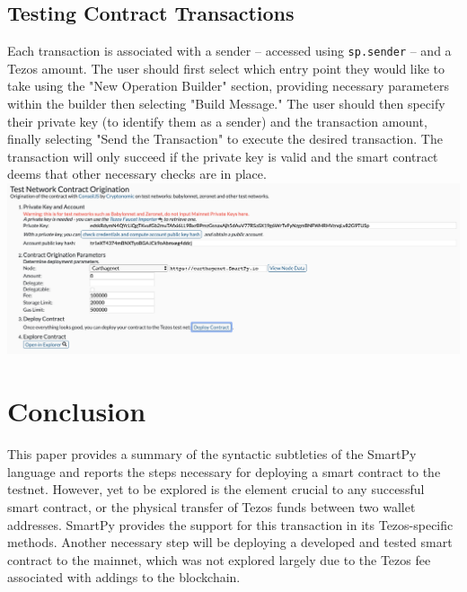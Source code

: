 \documentclass{article}
\begin{document}
\subsection{Testing Contract Transactions}
Each transaction is associated with a sender -- accessed using \lstinline!sp.sender! -- and a Tezos amount. The user should first select which entry point they would like to take using the "New Operation Builder" section, providing necessary parameters within the builder then selecting "Build Message." The user should then specify their private key (to identify them as a sender) and the transaction amount, finally selecting "Send the Transaction" to execute the desired transaction. The transaction will only succeed if the private key is valid and the smart contract deems that other necessary checks are in place. \\
\includegraphics[scale=0.44]{origination}
\section{Conclusion}
This paper provides a summary of the syntactic subtleties of the SmartPy language and reports the steps necessary for deploying a smart contract to the testnet. However, yet to be explored is the element crucial to any successful smart contract, or the physical transfer of Tezos funds between two wallet addresses. SmartPy provides the support for this transaction in its Tezos-specific methods. Another necessary step will be deploying a developed and tested smart contract to the mainnet, which was not explored largely due to the Tezos fee associated with addings to the blockchain.
\end{document}
